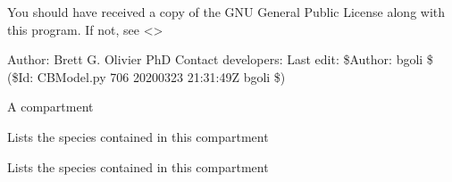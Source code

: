 \documentclass[letterpaper,10pt,english]{sphinxmanual}
\begin{document}
\sphinxAtStartPar
You should have received a copy of the GNU General Public License
along with this program.  If not, see \textless{}\textgreater{}

\sphinxAtStartPar
Author: Brett G. Olivier PhD
Contact developers: 
Last edit: \$Author: bgoli \$ (\$Id: CBModel.py 706 2020\sphinxhyphen{}03\sphinxhyphen{}23 21:31:49Z bgoli \$)

\begin{fulllineitems}
\label{\detokenize{modules_doc:cbmpy.CBModel.Compartment}}
\pysigstartsignatures
{}
\pysigstopsignatures
\sphinxAtStartPar
A compartment

\begin{fulllineitems}
\label{\detokenize{modules_doc:cbmpy.CBModel.Compartment.containsReactions}}
\pysigstartsignatures
{}
\pysigstopsignatures
\sphinxAtStartPar
Lists the species contained in this compartment

\end{fulllineitems}


\begin{fulllineitems}
\label{\detokenize{modules_doc:cbmpy.CBModel.Compartment.containsSpecies}}
\pysigstartsignatures
{}
\pysigstopsignatures
\sphinxAtStartPar
Lists the species contained in this compartment

\end{fulllineitems}


\end{fulllineitems}
\end{document}
